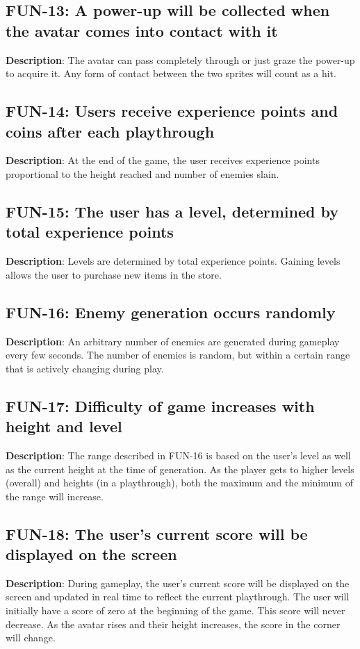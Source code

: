 \subsection{FUN-13: A power-up will be collected when the avatar comes into 
contact with it}
\textbf{Description}: The avatar can pass completely through or just
graze the power-up to acquire it. Any form of contact between the
two sprites will count as a hit.

\subsection{FUN-14: Users receive experience points and coins after each playthrough}
\textbf{Description}: At the end of the game, the user receives experience
points proportional to the height reached and number of enemies slain.

\subsection{FUN-15: The user has a level, determined by total experience points}
\textbf{Description}: Levels are determined by total experience points.
Gaining levels allows the user to purchase new items in the store.

\subsection{FUN-16: Enemy generation occurs randomly}
\textbf{Description}: An arbitrary number of enemies are generated
during gameplay every few seconds. The number of enemies is random,
but within a certain range that is actively changing during play. 

\subsection{FUN-17: Difficulty of game increases with height and level}
\textbf{Description}: The range described in FUN-16 is based on the
user\textquoteright{}s level as well as the current height at the
time of generation. As the player gets to higher levels (overall)
and heights (in a playthrough), both the maximum and the minimum of
the range will increase.

\subsection{FUN-18: The user\textquoteright{}s current score will be displayed
on the screen}
\textbf{Description}: During gameplay, the user\textquoteright{}s
current score will be displayed on the screen and updated in real
time to reflect the current playthrough. The user will initially have
a score of zero at the beginning of the game. This score will never
decrease. As the avatar rises and their height increases, the score
in the corner will change. 

